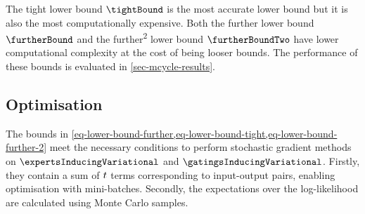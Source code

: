 \documentclass{mimosis-class/mimosis}
\numberwithin{equation}{chapter}
\newcommand{\numData}{\ensuremath{t}}
\newcommand{\modeInd}{\ensuremath{k}}
\newcommand{\NumData}{\ensuremath{\MakeUppercase{\numData}}}
\newcommand{\mode}[1]{\ensuremath{#1_{\modeInd}}}
\newcommand{\x}{\ensuremath{\mathbf{x}}}
\newcommand{\y}{\ensuremath{y}}
\newcommand{\gatingFunc}{\ensuremath{h}}
\newcommand{\GatingFunc}{\ensuremath{\mathbf{\gatingFunc}}}
\newcommand{\latentFunc}{\ensuremath{f}}
\begin{document}
{The tight lower bound \(\tightBound\) is the most accurate lower bound but it is also the most
computationally expensive.
Both the further lower bound \(\furtherBound\) and the further\textsuperscript{2} lower bound \(\furtherBoundTwo\)
have lower computational complexity at the cost of being looser bounds.
The performance of these bounds is evaluated in \cref{sec-mcycle-results}.

\subsection{Optimisation}
\label{sec:orgd9d8dd9}
\renewcommand{\expertSampleInd}{\ensuremath{s}}
\renewcommand{\ExpertSampleInd}{\ensuremath{S}}
\renewcommand{\gatingSampleInd}{\ensuremath{\hat{s}}}
\renewcommand{\GatingSampleInd}{\ensuremath{\hat{S}}}
\renewcommand{\batchSampleInd}{\ensuremath{i}}

\newcommand{\singleExpertLikelihoodSample}{\ensuremath{p\left(\y_{\batchSampleInd} \mid \expertInducingOutput^{(\expertSampleInd)}\right)}}
\renewcommand{\singleGatingLikelihoodSample}{\ensuremath{\Pr\left(\alpha_\batchSampleInd = \modeInd \mid \GatingFunc(\x_{\batchSampleInd})^{(\gatingSampleInd)} \right)}}

\newcommand{\singleGatingLikelihoodSample}{\ensuremath{\Pr\left(\alpha_\batchSampleInd = \modeInd \mid \GatingFunc_{\batchSampleInd}^{(\gatingSampleInd)} \right)}}

\newcommand{\gatingsVariationalSample}{\ensuremath{q(\GatingFunc(\x_{\batchSampleInd}))}}

The bounds in  \cref{eq-lower-bound-further,eq-lower-bound-tight,eq-lower-bound-further-2}
meet the necessary conditions to perform stochastic
gradient methods on \(\expertsInducingVariational\) and \(\gatingsInducingVariational\).
Firstly, they contain a sum of \(\NumData\) terms corresponding to input-output pairs, enabling optimisation
with mini-batches.
Secondly, the expectations over the log-likelihood are calculated using Monte Carlo samples.

}
\end{document}
